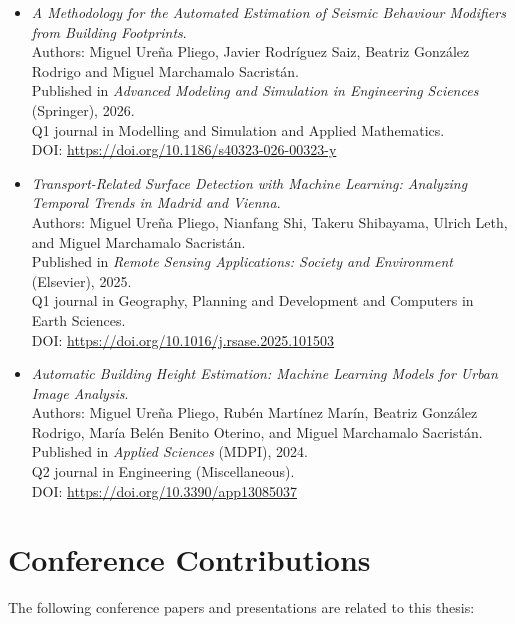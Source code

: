 \begin{itemize}

    \item \emph{A Methodology for the Automated Estimation of Seismic Behaviour Modifiers from Building Footprints}.\\
    Authors: Miguel Ureña Pliego, Javier Rodríguez Saiz, Beatriz González Rodrigo and Miguel Marchamalo Sacristán.\\
    Published in \textit{Advanced Modeling and Simulation in Engineering Sciences} (Springer), 2026.\\
    Q1 journal in Modelling and Simulation and Applied Mathematics.\\
    DOI: \url{https://doi.org/10.1186/s40323-026-00323-y}
    
    \item \emph{Transport-Related Surface Detection with Machine Learning: Analyzing Temporal Trends in Madrid and Vienna}.\\
    Authors: Miguel Ureña Pliego, Nianfang Shi, Takeru Shibayama, Ulrich Leth, and Miguel Marchamalo Sacristán.\\
    Published in \textit{Remote Sensing Applications: Society and Environment} (Elsevier), 2025.\\
    Q1 journal in Geography, Planning and Development and Computers in Earth Sciences.\\
    DOI: \url{https://doi.org/10.1016/j.rsase.2025.101503}
    
    \item \emph{Automatic Building Height Estimation: Machine Learning Models for Urban Image Analysis}.\\
    Authors: Miguel Ureña Pliego, Rubén Martínez Marín, Beatriz González Rodrigo, María Belén Benito Oterino, and Miguel Marchamalo Sacristán.\\
    Published in \textit{Applied Sciences} (MDPI), 2024.\\
    Q2 journal in Engineering (Miscellaneous).\\
    DOI: \url{https://doi.org/10.3390/app13085037}
    

\end{itemize}

\section*{Conference Contributions}

The following conference papers and presentations are related to this thesis:


